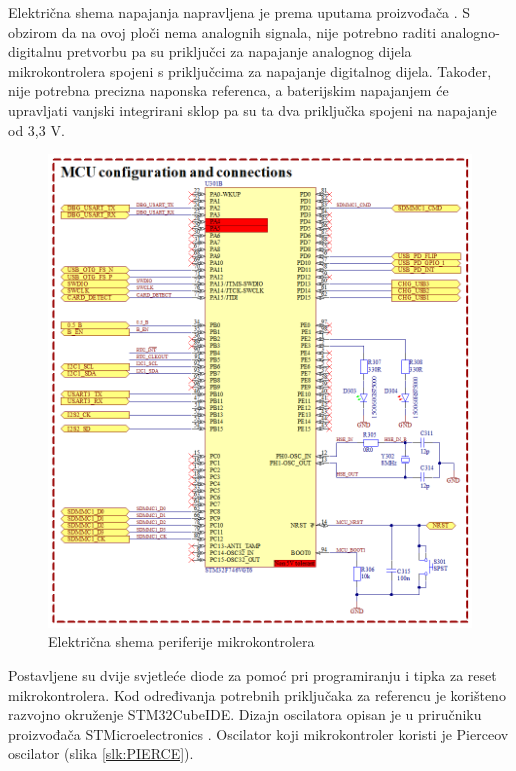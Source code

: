 Električna shema napajanja napravljena je prema uputama proizvođača \cite{stmicroelectronics:an4661}. S obzirom da na ovoj ploči nema analognih signala, nije potrebno raditi analogno-digitalnu pretvorbu pa su priključci za napajanje analognog dijela mikrokontrolera spojeni s priključcima za napajanje digitalnog dijela. Također, nije potrebna precizna naponska referenca, a baterijskim napajanjem će upravljati vanjski integrirani sklop pa su ta dva priključka spojeni na napajanje od 3,3 V.
\begin{figure}[H]
    \centering
    \includegraphics[width=\textwidth]{Figures/MCU_01.png}
    \caption{Električna shema periferije mikrokontrolera}
    \label{slk:MCU_PE}
\end{figure}
Postavljene su dvije svjetleće diode za pomoć pri programiranju i tipka za reset mikrokontrolera. Kod određivanja potrebnih priključaka za referencu je korišteno razvojno okruženje STM32CubeIDE. Dizajn oscilatora opisan je u priručniku proizvođača STMicroelectronics \cite{stmicroelectronics:an2867}. Oscilator koji mikrokontroler koristi je Pierceov oscilator (slika \ref{slk:PIERCE}).
